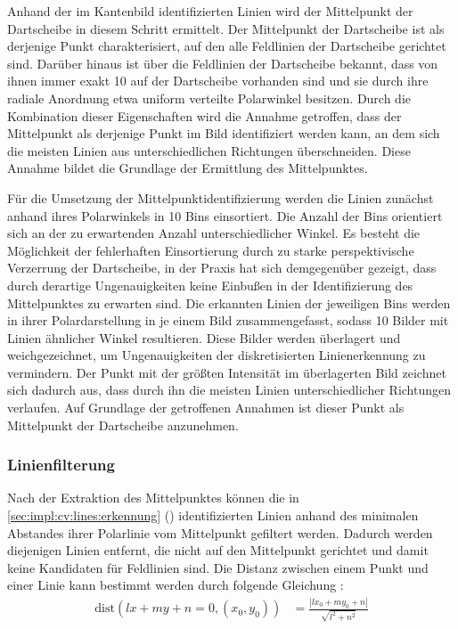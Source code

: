 Anhand der im Kantenbild identifizierten Linien wird der Mittelpunkt der Dartscheibe in diesem Schritt ermittelt. Der Mittelpunkt der Dartscheibe ist als derjenige Punkt charakterisiert, auf den alle Feldlinien der Dartscheibe gerichtet sind. Darüber hinaus ist über die Feldlinien der Dartscheibe bekannt, dass von ihnen immer exakt 10 auf der Dartscheibe vorhanden sind und sie durch ihre radiale Anordnung etwa uniform verteilte Polarwinkel besitzen. Durch die Kombination dieser Eigenschaften wird die Annahme getroffen, dass der Mittelpunkt als derjenige Punkt im Bild identifiziert werden kann, an dem sich die meisten Linien aus unterschiedlichen Richtungen überschneiden. Diese Annahme bildet die Grundlage der Ermittlung des Mittelpunktes.

Für die Umsetzung der Mittelpunktidentifizierung werden die Linien zunächst anhand ihres Polarwinkels in 10 Bins einsortiert. Die Anzahl der Bins orientiert sich an der zu erwartenden Anzahl unterschiedlicher Winkel. Es besteht die Möglichkeit der fehlerhaften Einsortierung durch zu starke perspektivische Verzerrung der Dartscheibe, in der Praxis hat sich demgegenüber gezeigt, dass durch derartige Ungenauigkeiten keine Einbußen in der Identifizierung des Mittelpunktes zu erwarten sind. Die erkannten Linien der jeweiligen Bins werden in ihrer Polardarstellung in je einem Bild zusammengefasst, sodass 10 Bilder mit Linien ähnlicher Winkel resultieren. Diese Bilder werden überlagert und weichgezeichnet, um Ungenauigkeiten der diskretisierten Linienerkennung zu vermindern. Der Punkt mit der größten Intensität im überlagerten Bild zeichnet sich dadurch aus, dass durch ihn die meisten Linien unterschiedlicher Richtungen verlaufen. Auf Grundlage der getroffenen Annahmen ist dieser Punkt als Mittelpunkt der Dartscheibe anzunehmen.

\subsubsection{Linienfilterung}
\label{sec:impl:cv:lines:filter}

Nach der Extraktion des Mittelpunktes können die in \autoref{sec:impl:cv:lines:erkennung} () identifizierten Linien anhand des minimalen Abstandes ihrer Polarlinie vom Mittelpunkt gefiltert werden. Dadurch werden diejenigen Linien entfernt, die nicht auf den Mittelpunkt gerichtet und damit keine Kandidaten für Feldlinien sind. Die Distanz zwischen einem Punkt und einer Linie kann bestimmt werden durch folgende Gleichung \cite{point_line_distance}:
\begin{align*}
    \text{dist}(lx + my + n = 0, (x_0, y_0)) & = \frac{| l x_0 + m y_0 + n|}{\sqrt{l^2+n^2}}
\end{align*}

